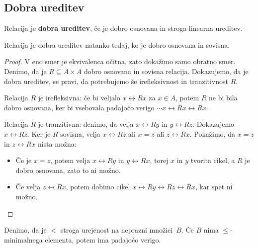 \subsection{Dobra ureditev}

\begin{definicija}
  Relacija je \textbf{dobra ureditev}, če je dobro osnovana in stroga linearna ureditev.
\end{definicija}

\begin{izrek}
  Relacija je dobra ureditev natanko tedaj, ko je dobro osnovana in sovisna.
\end{izrek}

\begin{proof}
  V eno smer je ekvivalenca očitna, zato dokažimo samo obratno smer. Denimo, da je
  $R \subseteq A \times A$ dobro osnovana in sovisna relacija. Dokazujemo, da je dobra ureditev, se pravi,
  da potrebujemo še irefleksivnost in tranzitivnost $R$.

  Relacija $R$ je irefleksivna: če bi veljalo $x \rel{R} x$ za $x \in A$, potem $R$ ne bi bila dobro
  osnovana, ker bi vsebovala padajočo verigo $\cdots x \rel{R} x \rel{R} x$.

  Relacija $R$ je tranzitivna: denimo, da velja $x \rel{R} y$ in $y \rel{R} z$. Dokazujemo $x \rel{R} z$. Ker je $R$
  sovisna, velja $x \rel{R} z$ ali $x = z$ ali $z \rel{R} x$. Pokažimo, da $x = z$ in $z \rel{R} x$ nista
  možna:
  \begin{itemize}
  \item Če je $x = z$, potem velja $x \rel{R} y$ in $y \rel{R} x$, torej $x$ in $y$ tvorita cikel, a
    $R$ je dobro osnovana, zato to ni možno.
  \item Če velja $z \rel{R} x$, potem dobimo cikel $x \rel{R} y \rel{R} z \rel{R} x$, kar spet ni možno.
  \end{itemize}
\end{proof}

\begin{lema}
  \label{lem:nepr-min-veriga}%
  Denimo, da je $<$ stroga urejenost na neprazni množici~$B$. Če $B$ nima
  $\leq$-minimalnega elementa, potem ima padajočo verigo.
\end{lema}

